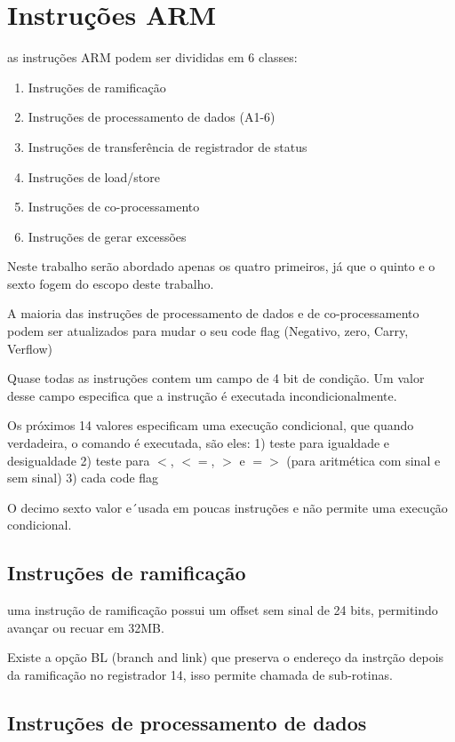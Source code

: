\section{Instruções ARM}

as instruções ARM podem ser divididas em 6 classes:
\begin{enumerate}
	\item Instruções de ramificação
	\item Instruções de processamento de dados (A1-6)
	\item Instruções de transferência de registrador de status
	\item Instruções de load/store
	\item Instruções de co-processamento
	\item Instruções de gerar excessões
\end{enumerate}

Neste trabalho serão abordado apenas os quatro primeiros, já que o quinto e o sexto fogem do escopo deste trabalho.

A maioria das instruções de processamento de dados e de co-processamento podem ser atualizados para mudar o seu code flag (Negativo, zero, Carry, Verflow)

Quase todas as instruções contem um campo de 4 bit de condição. Um valor desse campo especifica que a instrução é executada incondicionalmente.

Os próximos 14 valores especificam uma execução condicional, que quando verdadeira, o comando é executada, são eles:
1) teste para igualdade e desigualdade
2) teste para $<$, $<=$, $>$ e $=>$ (para aritmética com sinal e sem sinal)
3) cada code flag

O decimo sexto valor e´usada em poucas instruções e não permite uma execução condicional.

\subsection{Instruções de ramificação}

\label{instrucao_ramificacao}

uma instrução de ramificação possui um offset sem sinal de 24 bits, permitindo avançar ou recuar em 32MB.

Existe a opção BL (branch and link) que preserva o endereço da instrção depois da ramificação no registrador 14, isso permite chamada de sub-rotinas.

\subsection{Instruções de processamento de dados}

